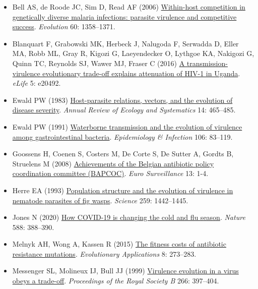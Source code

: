 \documentclass[
]{book}
\begin{document}
\begin{itemize}
\item
  Bell AS, de Roode JC, Sim D, Read AF (2006) \href{https://onlinelibrary.wiley.com/doi/abs/10.1111/j.0014-3820.2006.tb01215.x}{Within-host competition in genetically diverse malaria infections: parasite virulence and competitive success}. \emph{Evolution} 60: 1358--1371.
\item
  Blanquart F, Grabowski MK, Herbeck J, Nalugoda F, Serwadda D, Eller MA, Robb ML, Gray R, Kigozi G, Laeyendecker O, Lythgoe KA, Nakigozi G, Quinn TC, Reynolds SJ, Wawer MJ, Fraser C (2016) \href{https://elifesciences.org/articles/20492}{A transmission-virulence evolutionary trade-off explains attenuation of HIV-1 in Uganda}. \emph{eLife} 5: e20492.
\item
  Ewald PW (1983) \href{https://www.annualreviews.org/doi/10.1146/annurev.es.14.110183.002341}{Host-parasite relations, vectors, and the evolution of disease severity}. \emph{Annual Review of Ecology and Systematics} 14: 465--485.
\item
  Ewald PW (1991) \href{https://www.cambridge.org/core/journals/epidemiology-and-infection/article/waterborne-transmission-and-the-evolution-of-virulence-among-gastrointestinal-bacteria/295EB4F5E51B7AA0D946C27973053725}{Waterborne transmission and the evolution of virulence among gastrointestinal bacteria}. \emph{Epidemiology \& Infection} 106: 83--119.
\item
  Goossens H, Coenen S, Costers M, De Corte S, De Sutter A, Gordts B, Struelens M (2008) \href{https://www.eurosurveillance.org/content/10.2807/ese.13.46.19036-en}{Achievements of the Belgian antibiotic policy coordination committee (BAPCOC)}. \emph{Euro Surveillance} 13: 1-4.
\item
  Herre EA (1993) \href{https://www.science.org/doi/abs/10.1126/science.259.5100.1442}{Population structure and the evolution of virulence in nematode parasites of fig wasps}. \emph{Science} 259: 1442--1445.
\item
  Jones N (2020) \href{https://www.nature.com/articles/d41586-020-03519-3}{How COVID-19 is changing the cold and flu season}. \emph{Nature} 588: 388--390.
\item
  Melnyk AH, Wong A, Kassen R (2015) \href{https://onlinelibrary.wiley.com/doi/10.1111/eva.12196}{The fitness costs of antibiotic resistance mutations}. \emph{Evolutionary Applications} 8: 273--283.
\item
  Messenger SL, Molineux IJ, Bull JJ (1999) \href{https://royalsocietypublishing.org/doi/10.1098/rspb.1999.0651}{Virulence evolution in a virus obeys a trade-off}. \emph{Proceedings of the Royal Society B} 266: 397--404.

\end{itemize}
\end{document}
